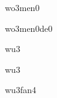 \begin{multicols*}{2}
\begin{verbete}[我们]{wo3men0}
\end{verbete}

\begin{verbete}[我们的]{wo3men0de0}
\end{verbete}

\begin{verbete}[五]{wu3}
\end{verbete}

\begin{verbete}[舞]{wu3}
\end{verbete}

\begin{verbete}[午饭]{wu3fan4}
\end{verbete}

\end{multicols*}
